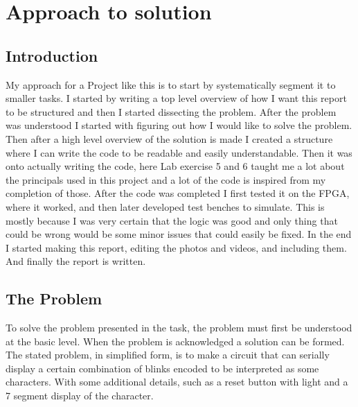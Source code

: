 \documentclass{article}
\begin{document}
\clearpage
\tableofcontents %
\clearpage
\listoffigures %
\hfill
\listoftables %



\section{Approach to solution}
\subsection{Introduction}
My approach for a Project like this is to start by systematically segment it to smaller tasks. I started by writing a top level overview of how I want this report to be structured and then I started dissecting the problem. After the problem was understood I started with figuring out how I would like to solve the problem. Then after a high level overview of the solution is made I created a structure where I can write the code to be readable and easily understandable. Then it was onto actually writing the code, here Lab exercise 5 and 6 taught me a lot about the principals used in this project and a lot of the code is inspired from my completion of those. After the code was completed I first tested it on the FPGA, where it worked, and then later developed test benches to simulate. This is mostly because I was very certain that the logic was good and only thing that could be wrong would be some minor issues that could easily be fixed. In the end I started making this report, editing the photos and videos, and including them. And finally the report is written.
\subsection{The Problem}
To solve the problem presented in the task, the problem must first be understood at the basic level. When the problem is acknowledged a solution can be formed. The stated problem, in simplified form, is to make a circuit that can serially display a certain combination of blinks encoded to be interpreted as some characters. With some additional details, such as a reset button with light and a 7 segment display of the character.
\end{document}
